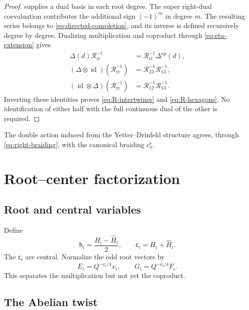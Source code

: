 \documentclass[11pt,a4paper]{article}
\newcommand{\ot}{\otimes}
\newcommand{\id}{\operatorname{id}}
\theoremstyle{definition}
\theoremstyle{remark}
\begin{document}
\begin{proof}
 supplies a dual basis in each root degree.
The super right-dual coevaluation contributes the additional sign
\((-1)^m\) in degree \(m\).  The resulting series belongs to
\eqref{eq:directed-completion}, and its inverse is defined recursively
degree by degree.  Dualizing multiplication and coproduct through
\eqref{eq:eta-extension} gives
\[
\begin{aligned}
 \Delta(d)\mathcal R_{\mathrm{rr}}^{-1}
 &=\mathcal R_{\mathrm{rr}}^{-1}\Delta^{\mathrm{op}}(d),\\
 (\Delta\ot\id)(\mathcal R_{\mathrm{rr}}^{-1})
 &=\mathcal R_{23}^{-1}\mathcal R_{13}^{-1},\\
 (\id\ot\Delta)(\mathcal R_{\mathrm{rr}}^{-1})
 &=\mathcal R_{12}^{-1}\mathcal R_{13}^{-1}.
\end{aligned}
\]
Inverting these identities proves \eqref{eq:R-intertwines} and
\eqref{eq:R-hexagons}.  No identification of either half with the full
continuous dual of the other is required.
\end{proof}

The double action induced from the Yetter--Drinfeld structure agrees,
through \eqref{eq:right-braiding}, with the canonical braiding
\(c_n^{\mathrm s}\).

\section{Root--center factorization}\label{sec:root-center}

\subsection{Root and central variables}

Define
\begin{equation}\label{eq:root-center-Cartan}
 \mathsf h_i=\frac{H_i-\widehat H_i}{2},\qquad
 \mathsf c_i=H_i+\widehat H_i.
\end{equation}
The \(\mathsf c_i\) are central.  Normalize the odd root vectors by
\begin{equation}\label{eq:root-generators}
 E_i=Q^{-\mathsf c_i/4}x_i,\qquad
 G_i=Q^{-\mathsf c_i/4}F_i.
\end{equation}
This separates the multiplication but not yet the coproduct.

\subsection{The Abelian twist}
\end{document}
